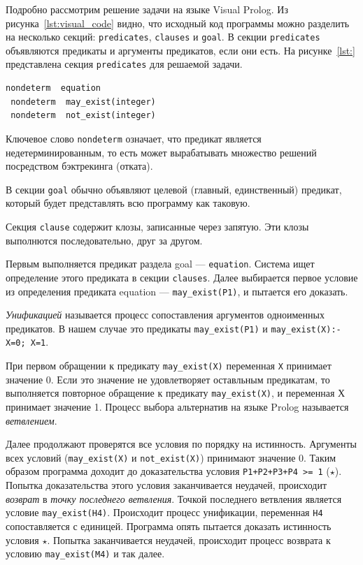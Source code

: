 \newpage

Подробно рассмотрим решение задачи на языке Visual Prolog. Из рисунка~\ref{lst:visual_code} видно,
что исходный код программы можно разделить на несколько секций: \texttt{predicates},
\texttt{clauses} и \texttt{goal}. В секции \texttt{predicates} объявляются предикаты
и аргументы предикатов, если они есть. На рисунке~\ref{lst:} представлена секция \texttt{predicates}
для решаемой задачи.
\begin{lstlisting}[style=source_code,caption=Секция \texttt{predicates} для решаемой задачи,label=lst:predicates]
 nondeterm  equation
 nondeterm  may_exist(integer)
 nondeterm  not_exist(integer)
\end{lstlisting}

Ключевое слово \texttt{nondeterm} означает, что предикат является недетерминированным, то есть
может вырабатывать множество решений посредством бэктрекинга (отката). 

В секции \texttt{goal} обычно объявляют целевой (главный, единственный) предикат, который будет
представлять всю программу как таковую. 

Секция \texttt{clause} содержит клозы, записанные через запятую. Эти клозы выполнются
последовательно, друг за другом. 

Первым выполняется предикат раздела goal --- \texttt{equation}. Система ищет определение
этого предиката в секции \texttt{clauses}. Далее выбирается первое условие из
определения предиката equation --- \texttt{may\_exist(P1)}, и пытается его доказать.  

\textit{Унификацией} называется процесс сопоставления аргументов одноименных предикатов.
В нашем случае это предикаты \texttt{may\_exist(P1)} и \texttt{may\_exist(X):-X=0; X=1}.

При первом обращении к предикату \texttt{may\_exist(X)} переменная \texttt{X} принимает
значение 0. Если это значение не удовлетворяет оставльным предикатам, то
выполняется повторное обращение к предикату \texttt{may\_exist(X)}, и переменная Х
принимает значение 1. Процесс выбора альтернатив на языке Prolog называется
\textit{ветвлением}.

Далее продолжают проверятся все условия по порядку на истинность.
Аргументы всех условий (\texttt{may\_exist(X)} и \texttt{not\_exist(X)})
принимают значение 0. Таким образом программа доходит до доказательства
условия \texttt{P1+P2+P3+P4 >= 1} ($\star$). Попытка доказательства этого условия
заканчивается неудачей, происходит \textit{возврат} в \textit{точку последнего
ветвления}. Точкой последнего ветвления является условие \texttt{may\_exist(H4)}.
Происходит процесс унификации, переменная \texttt{H4} сопоставляется с единицей.
Программа опять пытается доказать истинность условия $\star$. Попытка
заканчивается неудачей, происходит процесс возврата
к условию \texttt{may\_exist(M4)} и так далее.

